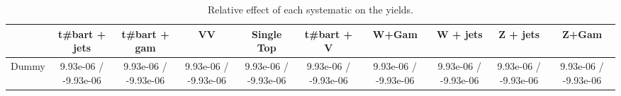 \begin{table}[htbp]
\begin{center}
\footnotesize
\begin{tabular}{|c|c|c|c|c|c|c|c|c|c|}
\hline 
      & t#bar{t} + jets      & t#bar{t} +  gam      & VV      & Single Top      & t#bar{t} + V      & W+Gam      & W + jets      & Z + jets      & Z+Gam \\ 
\hline 
  Dummy & 9.93e-06 / -9.93e-06 & 9.93e-06 / -9.93e-06 & 9.93e-06 / -9.93e-06 & 9.93e-06 / -9.93e-06 & 9.93e-06 / -9.93e-06 & 9.93e-06 / -9.93e-06 & 9.93e-06 / -9.93e-06 & 9.93e-06 / -9.93e-06 & 9.93e-06 / -9.93e-06 \\ 
\hline 
\end{tabular} 
\caption{Relative effect of each systematic on the yields.} 
\end{center} 
\end{table} 
